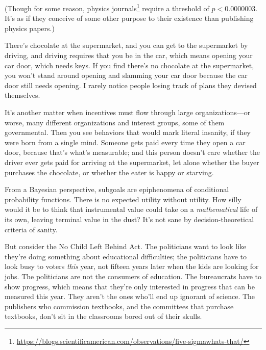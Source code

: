 {
 (Though for some reason, physics journals\footnote{\url{https://blogs.scientificamerican.com/observations/five-sigmawhats-that/}} require a threshold of $p < 0.0000003$. It's as if they conceive of some
other purpose to their existence than publishing physics papers.)}

{
 There's chocolate at the supermarket, and you can
get to the supermarket by driving, and driving requires that you be in
the car, which means opening your car door, which needs keys. If you
find there's no chocolate at the supermarket, you
won't stand around opening and slamming your car door
because the car door still needs opening. I rarely notice people losing
track of plans they devised themselves.}

{
 It's another matter when incentives must flow
through large organizations---or worse, many different organizations
and interest groups, some of them governmental. Then you see behaviors
that would mark literal insanity, if they were born from a single mind.
Someone gets paid every time they open a car door, because
that's what's measurable; and this
person doesn't care whether the driver ever gets paid
for arriving at the supermarket, let alone whether the buyer purchases
the chocolate, or whether the eater is happy or starving.}

{
 From a Bayesian perspective, subgoals are epiphenomena of
conditional probability functions. There is no expected utility without
utility. How silly would it be to think that instrumental value could
take on a \textit{mathematical} life of its own, leaving terminal value
in the dust? It's not sane by decision-theoretical
criteria of sanity.}

{
 But consider the No Child Left Behind Act. The politicians want to
look like they're doing something about educational
difficulties; the politicians have to look busy to voters \textit{this}
year, not fifteen years later when the kids are looking for jobs. The
politicians are not the consumers of education. The bureaucrats have to
show progress, which means that they're only interested
in progress that can be measured this year. They aren't
the ones who'll end up ignorant of science. The
publishers who commission textbooks, and the committees that purchase
textbooks, don't sit in the classrooms bored out of
their skulls.}

